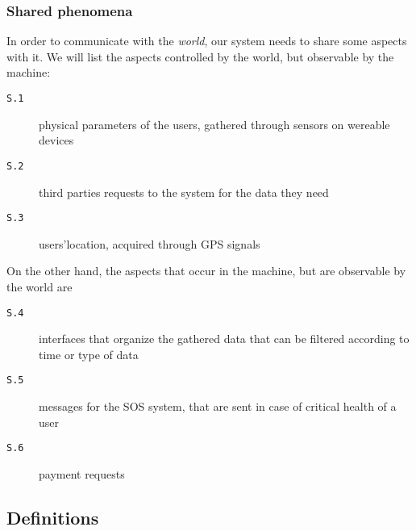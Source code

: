     \subsubsection{Shared phenomena}
    \label{sec:sharedp}

      In order to communicate with the \textit{world}, our system needs to share some aspects with it. We will list the aspects controlled by the world, but observable by the machine:
      \begin{description}
        \item[\texttt{S.1}] physical parameters of the users, gathered through sensors on wereable devices
        \item[\texttt{S.2}] third parties requests to the system for the data they need
        \item[\texttt{S.3}] users'location, acquired through GPS signals
      \end{description}
      On the other hand, the aspects that occur in the machine, but are observable by the world are
      \begin{description}
        \item[\texttt{S.4}] interfaces that organize the gathered data that can be filtered according to time or type of data
        \item[\texttt{S.5}] messages for the SOS system, that are sent in case of critical health of a user
        \item[\texttt{S.6}] payment requests
      \end{description}

  \subsection{Definitions}
  \label{sec:definitions}


